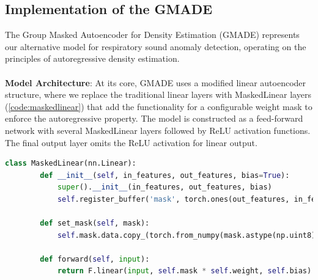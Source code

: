 \subsection{Implementation of the GMADE}
The Group Masked Autoencoder for Density Estimation (GMADE) represents our alternative model for respiratory sound anomaly detection, operating on the principles of autoregressive density estimation.\\\\
\textbf{Model Architecture}: At its core, GMADE uses a modified linear autoencoder structure, where we replace the traditional linear layers with MaskedLinear layers (\autoref{code:maskedlinear}) that add the functionality for a configurable weight mask to enforce the autoregressive property. The model is constructed as a feed-forward network with several MaskedLinear layers followed by ReLU activation functions. The final output layer omits the ReLU activation for linear output.
\begin{lstlisting}[label=code:maskedlinear,language=Python,caption={MaskedLinear PyTorch implementation as described by Karpathy, Andrej (2018)~\cite{githubMADE}}]
    class MaskedLinear(nn.Linear):    
        def __init__(self, in_features, out_features, bias=True):
            super().__init__(in_features, out_features, bias)        
            self.register_buffer('mask', torch.ones(out_features, in_features))
        
        def set_mask(self, mask):
            self.mask.data.copy_(torch.from_numpy(mask.astype(np.uint8).T))
            
        def forward(self, input):
            return F.linear(input, self.mask * self.weight, self.bias)
\end{lstlisting}

